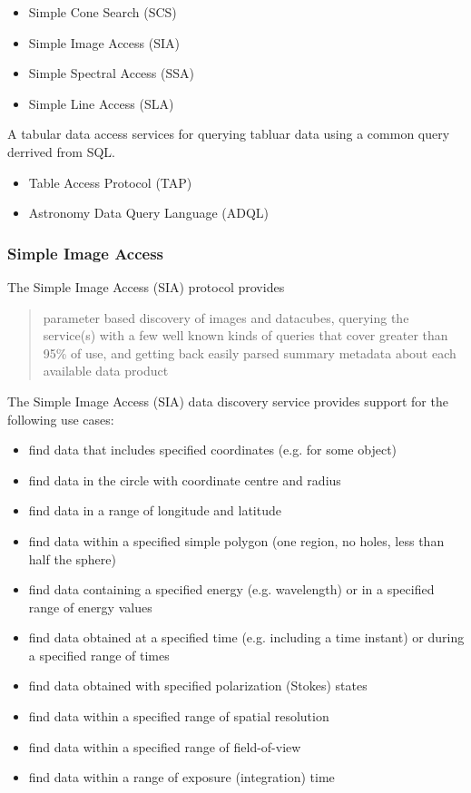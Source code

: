 \documentclass{article}
\begin{document}
\begin{itemize}
  \item Simple Cone Search (SCS)
  \item Simple Image Access (SIA)
  \item Simple Spectral Access (SSA)
  \item Simple Line Access (SLA)
\end{itemize}

A tabular data access services for querying tabluar data using a common query
derrived from SQL.

\begin{itemize}
  \item Table Access Protocol (TAP)
  \item Astronomy Data Query Language (ADQL)
\end{itemize}

\subsubsection{Simple Image Access}

The Simple Image Access (SIA) protocol provides 
\begin{quote}
parameter based discovery of images and datacubes, querying the service(s) with
a few well known kinds of queries that cover greater than 95\% of use, and
getting back easily parsed summary metadata about each available data product
\end{quote}

The Simple Image Access (SIA) data discovery service provides support for
the following use cases:

\begin{itemize}
  \item find data that includes specified coordinates (e.g. for some object) 
  \item find data in the circle with coordinate centre and radius 
  \item find data in a range of longitude and latitude 
  \item find data within a specified simple  polygon (one region, no holes, less
  than half the sphere)
  \item find data containing a specified energy (e.g. wavelength) or in a
  specified range of energy values
  \item find data obtained at a specified time (e.g. including a time instant)
  or during a specified range of times
  \item find data obtained with specified polarization (Stokes) states 
  \item find data within a specified range of spatial resolution 
  \item find data within a specified range of field-of-view 
  \item find data within a range of exposure (integration) time 
\end{itemize}
\end{document}

